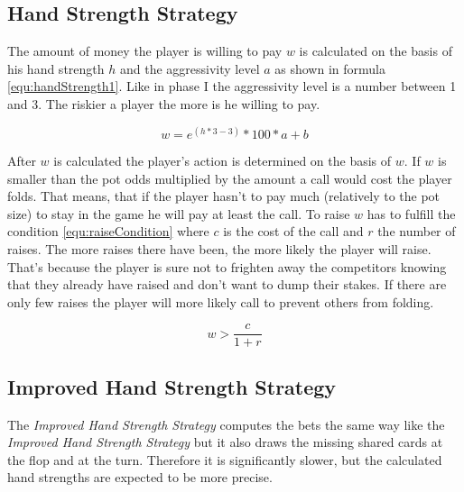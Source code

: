 \subsection{Hand Strength Strategy}
The amount of money the player is willing to pay $w$ is calculated on the basis of his hand strength $h$ and the aggressivity level $a$ as shown in formula \ref{equ:handStrength1}. Like in phase I the aggressivity level is a number between 1 and 3. The riskier a player the more is he willing to pay.

\begin{equation}
	\label{equ:handStrength1}
	w = e^{(h * 3 - 3)} * 100 * a + b
\end{equation}

After $w$ is calculated the player's action is determined on the basis of $w$. If $w$ is smaller than the pot odds multiplied by the amount a call would cost the player folds. That means, that if the player hasn't to pay much (relatively to the pot size) to stay in the game he will pay at least the call. To raise $w$ has to fulfill the condition \ref{equ:raiseCondition} where $c$ is the cost of the call and $r$ the number of raises. The more raises there have been, the more likely the player will raise. That's because the player is sure not to frighten away the competitors knowing that they already have raised and don't want to dump their stakes. If there are only few raises the player will more likely call to prevent others from folding.

\begin{equation}
	\label{equ:raiseCondition}
	w > \frac{c}{1 + r}
\end{equation}


\subsection{Improved Hand Strength Strategy}
The \emph{Improved Hand Strength Strategy} computes the bets the same way like the \emph{Improved Hand Strength Strategy} but it also draws the missing shared cards at the flop and at the turn. Therefore it is significantly slower, but the calculated hand strengths are expected to be more precise.

